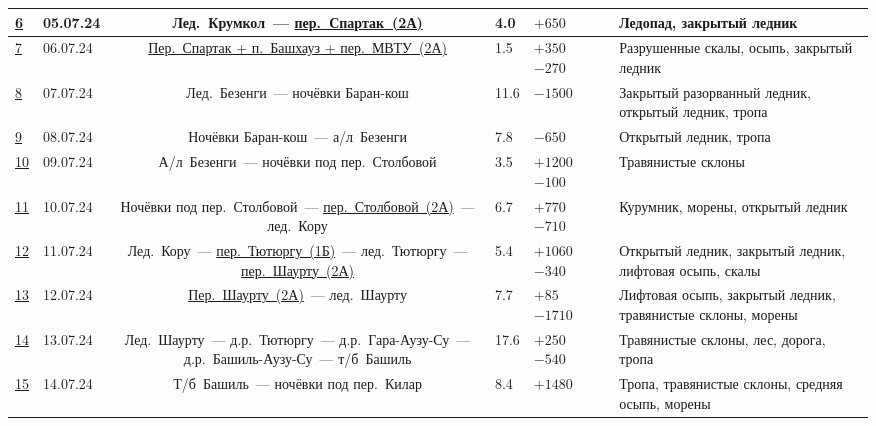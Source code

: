 {\begin{longtable}{|A|B|C|B|B|D|E|}
			\hyperref[subsec:Day6]{6}	&	05.07.24	&	Лед.~Крумкол~--- \hyperref[subsec:main_obstacles]{пер.~Спартак~(2А)}																																		&	4.0							&	$+650$ 			 		&			&	Ледопад, закрытый ледник													\\ \hline
			\hyperref[subsec:Day7]{7}	&	06.07.24	&	\hyperref[subsec:main_obstacles]{Пер.~Спартак + п.~Башхауз + пер.~МВТУ~(2А)}																																&	1.5							&	$+350$ $-270$	 		&			&	Разрушенные скалы, осыпь, закрытый ледник									\\ \hline
			\hyperref[subsec:Day8]{8}	&	07.07.24	&	Лед.~Безенги~--- ночёвки Баран-кош																																											&	11.6						&	 $-1500$	 		&			&	Закрытый разорванный ледник, открытый ледник, тропа							\\ \hline
			\hyperref[subsec:Day9]{9}	&	08.07.24	&	Ночёвки Баран-кош~--- а/л~Безенги																																											&	7.8							&	 $-650$	 		&			&	Открытый ледник, тропа														\\ \hline
			\hyperref[subsec:Day10]{10}	&	09.07.24	&	А/л~Безенги~--- ночёвки под пер.~Столбовой 																																									&	3.5							&	$+1200$ $-100$	 		&			&	Травянистые склоны															\\ \hline
			\hyperref[subsec:Day11]{11}	&	10.07.24	&	Ночёвки под пер.~Столбовой~--- \hyperref[subsec:main_obstacles]{пер.~Столбовой~(2А)}~--- лед.~Кору 																											&	6.7							&	$+770$ $-710$	 		&			&	Курумник, морены, открытый ледник											\\ \hline
			\hyperref[subsec:Day12]{12}	&	11.07.24	&	Лед.~Кору~--- \hyperref[subsec:main_obstacles]{пер.~Тютюргу~(1Б)}~--- лед.~Тютюргу~--- \hyperref[subsec:main_obstacles]{пер.~Шаурту~(2А)}																	&	5.4							&	$+1060$ $-340$	 		&			&	Открытый ледник, закрытый ледник, лифтовая осыпь, скалы						\\ \hline
			\hyperref[subsec:Day13]{13}	&	12.07.24	&	\hyperref[subsec:main_obstacles]{Пер.~Шаурту~(2А)}~--- лед.~Шаурту 																																			&	7.7							&	$+85$ $-1710$	 		&			&	Лифтовая осыпь, закрытый ледник, травянистые склоны, морены					\\ \hline
			\hyperref[subsec:Day14]{14}	&	13.07.24	&	Лед.~Шаурту~--- д.р.~Тютюргу~--- д.р.~Гара-Аузу-Су~--- д.р.~Башиль-Аузу-Су~--- т/б~Башиль																													&	17.6						&	$+250$ $-540$	 		&			&	Травянистые склоны, лес, дорога, тропа										\\ \hline
			\hyperref[subsec:Day15]{15}	&	14.07.24	&	Т/б~Башиль~--- ночёвки под пер.~Килар																																										&	8.4							&	$+1480$ 		 		&			&	Тропа, травянистые склоны, средняя осыпь, морены							\\ \hline

\end{longtable}}
